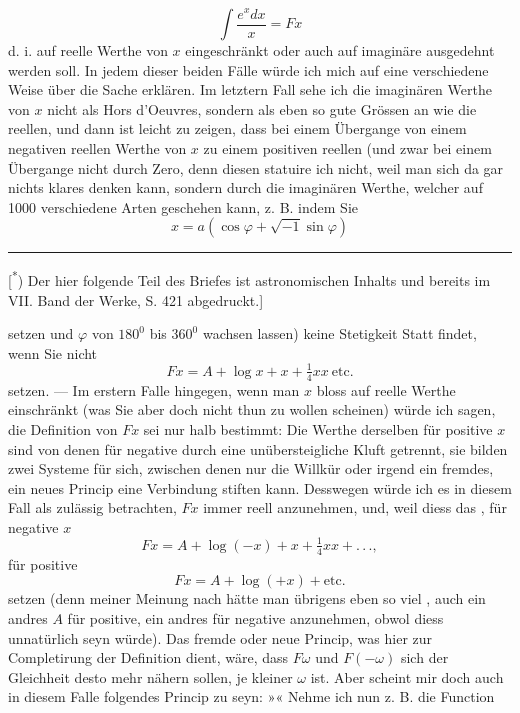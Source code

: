 \[
\int\frac{e^x dx}{x}=Fx
\]
\noindent d. i. auf reelle Werthe von $x$ eingeschränkt oder auch auf imaginäre ausgedehnt werden soll. In jedem dieser beiden Fälle würde ich mich auf eine verschiedene Weise über die Sache erklären. Im letztern Fall sehe ich die imaginären Werthe von $x$ nicht als Hors d’Oeuvres, sondern als eben so gute Grössen an wie die reellen, und dann ist leicht zu zeigen, dass bei einem Übergange von einem negativen reellen Werthe von $x$ zu einem positiven reellen (und zwar bei einem Übergange nicht durch Zero, denn diesen statuire ich nicht, weil man sich da gar nichts klares denken kann, sondern durch die imaginären Werthe, welcher auf 1000 verschiedene Arten geschehen kann, z. B. indem Sie
\[
x=a(\cos\varphi+\surd{-1}\sin\varphi)
\]
\par\medskip\noindent\rule{.24\linewidth}{.4pt}\par\smallskip
{\small
\noindent\hspace*{\parindent}[\textsuperscript{*}) Der hier folgende Teil des Briefes ist astronomischen Inhalts und bereits im VII. Band der Werke, S. 421 abgedruckt.]
\par}
\clearpage{}
\noindent setzen und $\varphi$ von $180^{0}$ bis $360^{0}$ wachsen lassen) keine Stetigkeit Statt findet, wenn Sie nicht 
\[
Fx=A+\log x+x+\tfrac{1}{4}xx\ \text{etc.}
\]
\noindent setzen. — Im erstern Falle hingegen, wenn man $x$ bloss auf reelle Werthe einschränkt (was Sie aber doch nicht thun zu wollen scheinen) würde ich sagen, die Definition von $Fx$ sei nur halb bestimmt: Die Werthe derselben für positive $x$ sind von denen für negative durch eine unübersteigliche Kluft getrennt, sie bilden zwei Systeme für sich, zwischen denen  nur die Willkür oder irgend ein fremdes, ein neues Princip eine Verbindung stiften kann. Desswegen würde ich es in diesem Fall als zulässig betrachten, $Fx$ immer reell anzunehmen, und, weil diess das , für negative $x$
\[
Fx=A+\log(-x)+x+\tfrac{1}{4}xx+{.}\,{.}\,{.},
\]
\noindent für positive
\[
Fx=A+\log(+x)+\text{etc.}
\]
\noindent setzen (denn meiner Meinung nach hätte man übrigens eben so viel , auch ein andres $A$ für positive, ein andres für negative anzunehmen, obwol diess unnatürlich seyn würde). Das fremde oder neue Princip, was hier zur Completirung der Definition dient, wäre, dass $F\omega$ und $F(-\omega)$ sich der Gleichheit desto mehr nähern sollen, je kleiner $\omega$ ist. Aber  scheint mir doch auch in diesem Falle folgendes Princip zu seyn: »« Nehme ich nun z. B. die Function
